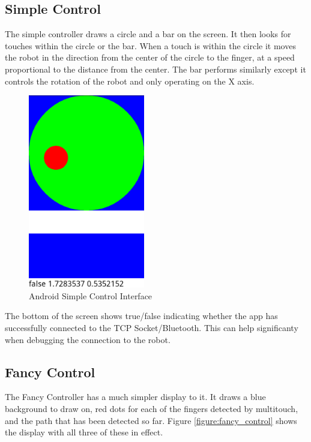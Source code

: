 \subsection{Simple Control}

The simple controller draws a circle and a bar on the screen.  It then looks for touches within the circle or the bar.  When a touch is within the circle it moves the robot in the direction from the center of the circle to the finger, at a speed proportional to the distance from the center.  The bar performs similarly except it controls the rotation of the robot and only operating on the X axis.

\begin{figure}[H]
    \begin{center}
        \includegraphics[width=2in]{images/simple_control.png}
    \end{center}
    \caption{Android Simple Control Interface}
    \label{figure:simple_control}
\end{figure}

The bottom of the screen shows true/false indicating whether the app has successfully connected to the TCP Socket/Bluetooth.  This can help significanty when debugging the connection to the robot.

\subsection{Fancy Control}

The Fancy Controller has a much simpler display to it.  It draws a blue background to draw on,  red dots for each of the fingers detected by multitouch, and the path that has been detected so far.  Figure \ref{figure:fancy_control} shows the display with all three of these in effect.

